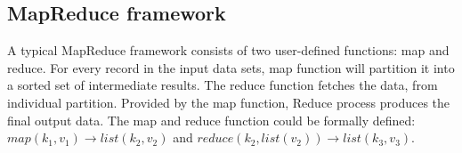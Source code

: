 \subsection{MapReduce framework} %
A typical MapReduce framework consists of two user-defined functions: map and reduce. For every record in the input data sets, map function will partition it into a sorted set of intermediate results. The reduce function fetches the data, from individual partition. Provided by the map function, Reduce process produces the final output data. The map and reduce function could be formally defined: \(map(k_{1},v_{1}) \rightarrow list(k_{2}, v_{2}) \) and \(reduce(k_{2},list(v_{2})) \rightarrow list(k_{3}, v_{3}) \).
